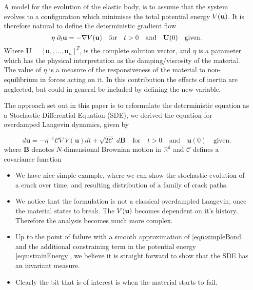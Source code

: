 \documentclass{article}
\begin{document}
\smallskip
A model for the evolution of the elastic body, is to assume that the system evolves to a configuration which minimises the total potential energy $V({\bf u})$. It is therefore natural to define the deterministic gradient flow
$$
\eta \;\partial_t \textbf{u} = -\nabla V ({\bf u}) \quad \mbox{for} \quad t > 0 \quad \mbox{and} \quad \textbf{U}(0) \quad \mbox{given}.
$$
Where $\textbf{U} = [\textbf{u}_1,\ldots,\textbf{u}_n]^T$, is the complete solution vector, and $\eta$ is a parameter which has the physical interpretation as the damping/viscosity of the material. The value of $\eta$ is a measure of the responsiveness of the material to non-equilibrium in forces acting on it. In this contribution the effects of inertia are neglected, but could in general be included by defining the new variable.

\smallskip\noindent
The approach set out in this paper is to reformulate the deterministic equation as a Stochastic Differential Equation (SDE), we derived the equation for overdamped Langevin dynamics, given by

\smallskip
\begin{equation}\label{eqn:sde}
d\textbf{u} = -\eta^{-1}\mathcal{C}\nabla V (\textbf{u})dt  + \sqrt{2\mathcal C}\;d\textbf{B} \quad \mbox{for} \quad t > 0 \quad \mbox{and} \quad \textbf{u}(0) \quad \mbox{given}.
\end{equation}
where $\textbf{B}$ denotes $N$-dimensional Brownian motion in $\mathbb R^d$ and $\mathcal C$ defines a covariance function

\smallskip
{\color{blue}

\begin{itemize}
\item We have nice simple example, where we can show the stochastic evolution of a crack over time, and resulting distribution of a family of crack paths.

\item We notice that the formulation is not a classical overdampled Langevin, once the material states to break. The $V({\bf u})$ becomes dependent on it's history. Therefore the analysis becomes much more complex.

\item Up to the point of failure with a smooth approximation of \eqref{eqn:simpleBond} and the additional constraining term in the potential energy \eqref{eqn:strainEnergy}, we believe it is straight forward to show that the SDE has an invariant measure.

\item Clearly the bit that is of interest is when the material starts to fail.
\end{itemize}

}
\end{document}
